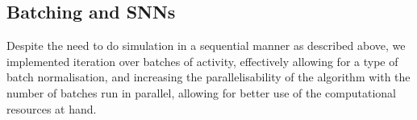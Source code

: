 \documentclass[mphil,deptreport,ianc]{infthesis} %
\begin{document}





\subsection{Batching and SNNs}

Despite the need to do simulation in a sequential manner as described above, we implemented iteration over batches of activity, effectively allowing for a type of batch normalisation, and increasing the parallelisability of the algorithm with the number of batches run in parallel, allowing for better use of the computational resources at hand.
\end{document}

